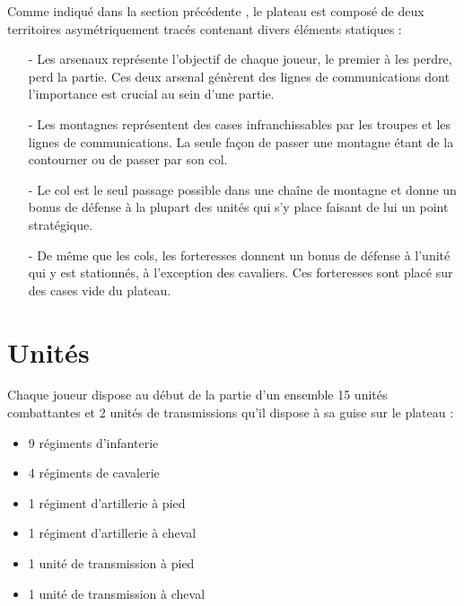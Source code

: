   Comme indiqué dans la section précédente , le plateau est composé de deux territoires asymétriquement tracés contenant divers éléments statiques :\\ 
  
   \begin{itemize}
       \renewcommand{\labelitemi}{$\bullet$}
    
      \item[-] Les arsenaux représente l'objectif de chaque joueur, le premier à les perdre, perd la partie. Ces deux arsenal génèrent des lignes de communications dont l'importance est crucial au sein d'une partie. 
      \item[-] Les montagnes représentent des cases infranchissables par les troupes et les lignes de communications. La seule façon de passer une montagne étant de la contourner ou de passer par son col. 
      \item[-] Le col est le seul passage possible dans une chaîne de montagne et donne un bonus de défense à la plupart des unités qui s'y place faisant de lui un point stratégique.
      \item[-] De même que les cols, les forteresses donnent un bonus de défense à l'unité qui y est stationnés, à l'exception des cavaliers. Ces forteresses sont placé sur des cases vide du plateau.

  \end{itemize}
  
  \section{Unités}
  
  Chaque joueur dispose au début de la partie d'un ensemble 15 unités combattantes et 2 unités de transmissions qu'il dispose à sa guise sur le plateau :\\  
  
  
  \begin{itemize}
    \renewcommand{\labelitemi}{$\bullet$}
      \item 9 régiments d'infanterie
      \item 4 régiments de cavalerie
      \item 1 régiment d'artillerie à pied
      \item 1 régiment d'artillerie à cheval
      \item 1 unité de transmission à pied
      \item 1 unité de transmission à cheval\\
      
  \end{itemize} 
  
